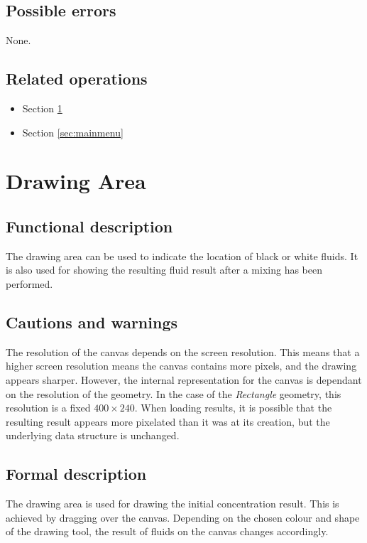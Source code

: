   \subsection*{Possible errors}
  None.

  \subsection*{Related operations}
  \begin{itemize}
    \item Section \ref{sec:drawingarea}
    \item Section \ref{sec:mainmenu}
  \end{itemize}

\section{Drawing Area}
\label{sec:drawingarea}
  \subsection*{Functional description}
  The drawing area can be used to indicate the location of black or white fluids. It is also used for showing the resulting fluid result after a mixing has been performed.
  
  \subsection*{Cautions and warnings}
  The resolution of the canvas depends on the screen resolution. This means that a higher screen resolution means the canvas contains more pixels, and the drawing appears sharper. However, the internal representation for the canvas is dependant on the resolution of the geometry. In the case of the \emph{Rectangle} geometry, this resolution is a fixed $400 \times 240$. When loading results, it is possible that the resulting result appears more pixelated than it was at its creation, but the underlying data structure is unchanged.
  
  \subsection*{Formal description}
  The drawing area is used for drawing the initial concentration result. This is achieved by dragging over the canvas. Depending on the chosen colour and shape of the drawing tool, the result of fluids on the canvas changes accordingly.
  
